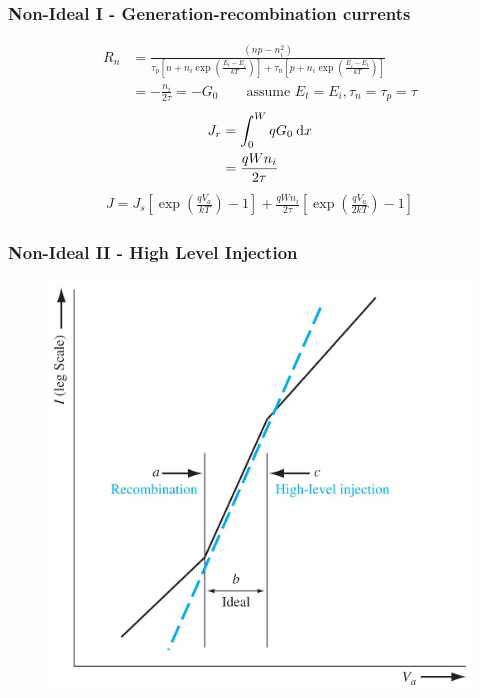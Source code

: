 \documentclass{beamer}
\begin{document}
    \begin{frame} \frametitle{Non-Ideal I - Generation-recombination currents}
        \begin{equation*}
            \begin{aligned}
                R_n &= \frac{(np - n_i^2)}{\tau_p \left[ n + n_i \exp \left( \frac{E_t - E_i}{kT}  \right) \right] + \tau_n \left[ p + n_i \exp \left( \frac{E_i - E_t}{kT}  \right) \right]} \\
                &= -\frac{n_i}{2\tau} = -G_0 \qquad \text{assume } E_t = E_i, \tau_n = \tau_p = \tau
            \end{aligned}
        \end{equation*}
        \begin{equation*}
            \begin{aligned}
                J_r &= \int_0^W q G_0 \: \mathrm{d} x \\
                &= \frac{qWn_i}{2\tau} 
            \end{aligned}
        \end{equation*}
        \begin{equation*}
            \begin{aligned}
                J = J_s \left[ \exp\left( \frac{qV_a}{kT}  \right)  - 1 \right] + \frac{q W n_i}{2\tau} \left[ \exp \left( \frac{qV_a}{2kT}  \right) - 1 \right]
            \end{aligned}
        \end{equation*}
    \end{frame}

    \begin{frame} \frametitle{Non-Ideal II - High Level Injection}
        \begin{figure}[H]
            \centering
            \includegraphics[width=0.6\linewidth]{High-level-injection.jpg}
            \label{fig:High-level-injection.jpg}
        \end{figure}
    \end{frame}
\end{document}
